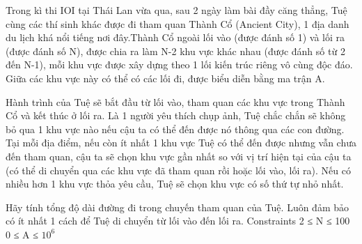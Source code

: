 Trong kì thi IOI tại Thái Lan vừa qua, sau 2 ngày làm bài đầy căng thẳng, Tuệ cùng các thí sinh khác được đi tham quan Thành Cổ (Ancient City), 1 địa danh du lịch khá nổi tiếng nơi đây.Thành Cổ ngoài lối vào (được đánh số 1) và lối ra (được đánh số N), được chia ra làm N-2 khu vực khác nhau (được đánh số từ 2 đến N-1), mỗi khu vực được xây dựng theo 1 lối kiến trúc riêng vô cùng độc đáo. Giữa các khu vực này có thể có các lối đi, được biểu diễn bằng ma trận A.  

   Hành trình của Tuệ sẽ bắt đầu từ lối vào, tham quan các khu vực trong Thành Cổ và kết thúc ở lối ra. Là 1 người yêu thích chụp ảnh, Tuệ chắc chắn sẽ không bỏ qua 1 khu vực nào nếu cậu ta có thể đến được nó thông qua các con đường. Tại mỗi địa điểm, nếu còn ít nhất 1 khu vực Tuệ có thể đến được nhưng vẫn chưa đến tham quan, cậu ta sẽ chọn khu vực gần nhất so với vị trí hiện tại của cậu ta (có thể di chuyển qua các khu vực đã tham quan rồi hoặc lối vào, lối ra). Nếu có nhiều hơn 1 khu vực thỏa yêu cầu, Tuệ sẽ chọn khu vực có số thứ tự nhỏ nhất.  

   Hãy tính tổng độ dài đường đi trong chuyến tham quan của Tuệ. Luôn đảm bảo có ít nhất 1 cách để Tuệ di chuyển từ lối vào đến lối ra.
Constraints
2 ≤ N ≤ 100   
\\   0 ≤ A ≤ $10^{6}$